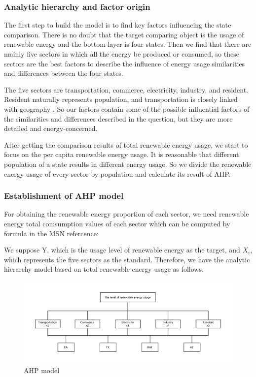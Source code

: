 \documentclass[a4paper,11pt]{article}
\begin{document}
\subsubsection{Analytic hierarchy and factor origin}

\par The first step to build the model is to find key factors influencing the state comparison. There is no doubt that the target comparing object is the usage of renewable energy and the bottom layer is four states. Then we find that there are mainly five sectors in which all the energy be produced or consumed, so these sectors are the best factors to describe the influence of energy usage similarities and differences between the four states.

\par The five sectors are transportation, commerce, electricity, industry, and resident. Resident naturally represents population, and transportation is closely linked with geography \cite{L1}. So our factors contain some of the possible influential factors of the similarities and differences described in the question, but they are more detailed and energy-concerned.

\par After getting the comparison results of total renewable energy usage, we start to focus on the per capita renewable energy usage. It is reasonable that different population of a state results in different energy usage. So we divide the renewable energy usage of every sector by population and calculate its result of AHP.

\subsubsection{Establishment of AHP model}

\par For obtaining the renewable energy proportion of each sector, we need renewable energy total comsumption values of each sector which can be computed by formula in the MSN refercence:

\par We suppose Y, which is the usage level of renewable energy as the target, and $X_i$, which represents the five sectors as the standard. Therefore, we have the analytic hierarchy model based on total renewable energy usage as follows.\cite{6}

\begin{figure}[H] 
    \centering 
    \includegraphics[width=1.0\textwidth]{./Pic/AHP.pdf}
    \caption{AHP model}
\end{figure}
\end{document}
